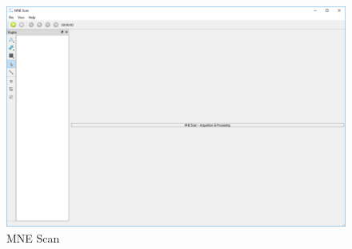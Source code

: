 \begin{figure}
	
	\begin{center}
		
		\includegraphics[scale=0.3]{Figures/MNE-Scan.PNG}
	
	\end{center}
	
	\caption{MNE Scan}

\end{figure}

